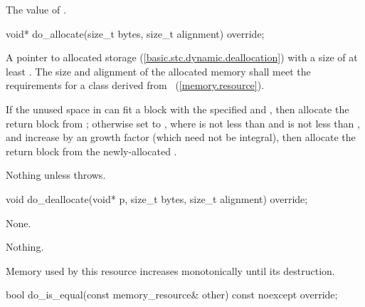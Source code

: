 \begin{itemdescr}
\pnum
\returns
The value of .
\end{itemdescr}

%
\begin{itemdecl}
void* do_allocate(size_t bytes, size_t alignment) override;
\end{itemdecl}

\begin{itemdescr}
\pnum
\returns
A pointer to allocated storage (\ref{basic.stc.dynamic.deallocation})
with a size of at least .
The size and alignment of the allocated memory shall meet the requirements
for a class derived from ~(\ref{memory.resource}).

\pnum
\effects
If the unused space in 
can fit a block with the specified  and ,
then allocate the return block from ;
otherwise set  to ,
where  is not less than  and
 is not less than ,
and increase 
by an  growth factor (which need not be integral),
then allocate the return block from the newly-allocated .

\pnum
\throws
Nothing unless  throws.
\end{itemdescr}

%
\begin{itemdecl}
void do_deallocate(void* p, size_t bytes, size_t alignment) override;
\end{itemdecl}

\begin{itemdescr}
\pnum
\effects
None.

\pnum
\throws
Nothing.

\pnum
\remarks
Memory used by this resource increases monotonically until its destruction.
\end{itemdescr}

%
\begin{itemdecl}
bool do_is_equal(const memory_resource& other) const noexcept override;
\end{itemdecl}

